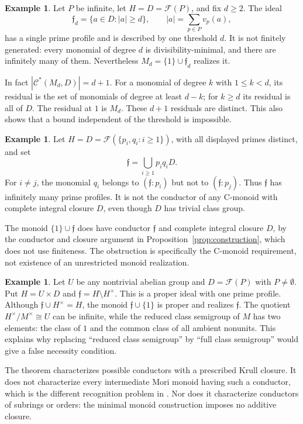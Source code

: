 \documentclass[11pt]{article}
\theoremstyle{definition}
\newtheorem{example}[theorem]{Example}
\newcommand{\F}{\mathcal F}
\newcommand{\C}{\mathcal C}
\newcommand{\ff}{\mathfrak f}
\begin{document}
\begin{example}\label{ex:degree}
Let $P$ be infinite, let $H=D=\F(P)$, and fix $d\ge2$. The ideal
\[
 \ff_d=\{a\in D:|a|\ge d\},\qquad |a|=\sum_{p\in P}v_p(a),
\]
has a single prime profile and is described by one threshold $d$. It is not finitely generated: every monomial of degree $d$ is divisibility-minimal, and there are infinitely many of them. Nevertheless $M_d=\{1\}\cup\ff_d$ realizes it.

In fact $|\C^*(M_d,D)|=d+1$. For a monomial of degree $k$ with $1\le k<d$, its residual is the set of monomials of degree at least $d-k$; for $k\ge d$ its residual is all of $D$. The residual at $1$ is $M_d$. These $d+1$ residuals are distinct. This also shows that a bound independent of the threshold is impossible.
\end{example}

\begin{example}\label{ex:matching}
Let $H=D=\F(\{p_i,q_i:i\ge1\})$, with all displayed primes distinct, and set
\[
 \ff=\bigcup_{i\ge1}p_iq_iD.
\]
For $i\ne j$, the monomial $q_i$ belongs to $(\ff:p_i)$ but not to $(\ff:p_j)$. Thus $\ff$ has infinitely many prime profiles. It is not the conductor of any C-monoid with complete integral closure $D$, even though $D$ has trivial class group.

The monoid $\{1\}\cup\ff$ does have conductor $\ff$ and complete integral closure $D$, by the conductor and closure argument in Proposition~\ref{prop:construction}, which does not use finiteness. The obstruction is specifically the C-monoid requirement, not existence of an unrestricted monoid realization.
\end{example}

\begin{example}\label{ex:units}
Let $U$ be any nontrivial abelian group and $D=\F(P)$ with $P\ne\emptyset$. Put $H=U\times D$ and $\ff=H\setminus H^\times$. This is a proper ideal with one prime profile. Although $\ff\cup H^\times=H$, the monoid $\ff\cup\{1\}$ is proper and realizes $\ff$. The quotient $H^\times/M^\times\cong U$ can be infinite, while the reduced class semigroup of $M$ has two elements: the class of $1$ and the common class of all ambient nonunits. This explains why replacing ``reduced class semigroup'' by ``full class semigroup'' would give a false necessity condition.
\end{example}

The theorem characterizes possible conductors with a prescribed Krull closure. It does not characterize every intermediate Mori monoid having such a conductor, which is the different recognition problem in \cite[Problem 18]{GKL}. Nor does it characterize conductors of subrings or orders: the minimal monoid construction imposes no additive closure.
\end{document}
